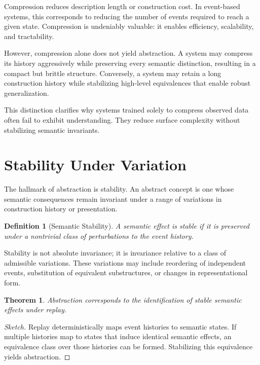 \documentclass[11pt]{article}
\newtheorem{definition}{Definition}[section]
\newtheorem{theorem}{Theorem}[section]
\begin{document}
Compression reduces description length or construction cost. In event-based systems, this corresponds to reducing the number of events required to reach a given state. Compression is undeniably valuable: it enables efficiency, scalability, and tractability.

However, compression alone does not yield abstraction. A system may compress its history aggressively while preserving every semantic distinction, resulting in a compact but brittle structure. Conversely, a system may retain a long construction history while stabilizing high-level equivalences that enable robust generalization.

This distinction clarifies why systems trained solely to compress observed data often fail to exhibit understanding. They reduce surface complexity without stabilizing semantic invariants.

\section{Stability Under Variation}

The hallmark of abstraction is stability. An abstract concept is one whose semantic consequences remain invariant under a range of variations in construction history or presentation.

\begin{definition}[Semantic Stability]
A semantic effect is stable if it is preserved under a nontrivial class of perturbations to the event history.
\end{definition}

Stability is not absolute invariance; it is invariance relative to a class of admissible variations. These variations may include reordering of independent events, substitution of equivalent substructures, or changes in representational form.

\begin{theorem}
Abstraction corresponds to the identification of stable semantic effects under replay.
\end{theorem}

\begin{proof}[Sketch]
Replay deterministically maps event histories to semantic states. If multiple histories map to states that induce identical semantic effects, an equivalence class over those histories can be formed. Stabilizing this equivalence yields abstraction.
\end{proof}
\end{document}
